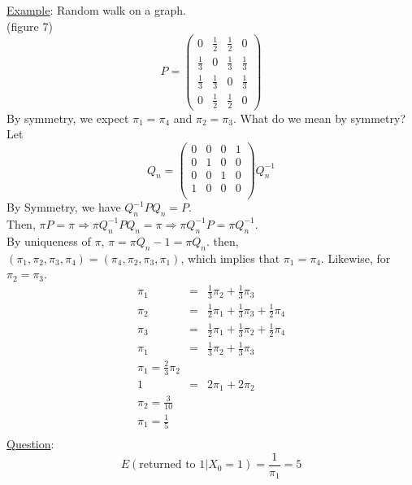   \underline{Example}: Random walk on a graph.\\
    (figure 7)\\
    $$
    P = \left(\begin{array}{cccc}
        0 & \frac{1}{2} & \frac{1}{2} & 0\\
        \frac{1}{3} & 0 & \frac{1}{3} & \frac{1}{3}\\
        \frac{1}{3} & \frac{1}{3} & 0 & \frac{1}{3}\\
        0 & \frac{1}{2} & \frac{1}{2} & 0
      \end{array}\right)
    $$
    By symmetry, we expect $\pi_1 = \pi_4$ and $\pi_2 = \pi_3$. What do we 
    mean by symmetry?
    Let 
    $$
     Q_n = \left(\begin{array}{cccc}
      0 & 0 & 0 & 1\\
      0 & 1 & 0 & 0\\
      0 & 0 & 1 & 0\\
      1 & 0 & 0 & 0\\
      \end{array}\right)
     Q_n^{-1}
    $$
    By Symmetry, we have $Q_n^{-1}PQ_n = P$.\\
    Then, $\pi P = \pi \Rightarrow \pi Q_n^{-1}PQ_n = \pi
    \Rightarrow \pi Q_n^{-1} P = \pi Q_n^{-1}$.\\
    By uniqueness of $\pi$, $\pi = \pi Q_{n}-1 = \pi Q_{n}$.
    then, $(\pi_1, \pi_2, \pi_3, \pi_4) = (\pi_4, \pi_2, \pi_3, \pi_1)$, which
    implies that $\pi_1 = \pi_4$. Likewise, for $\pi_2 = \pi_3$.\\
    \begin{eqnarray*}
      \pi_1 & = & \frac{1}{3}\pi_2 + \frac{1}{3}\pi_3\\
      \pi_2 & = & \frac{1}{2}\pi_1 + \frac{1}{3}\pi_3 + \frac{1}{2}\pi_4\\
      \pi_3 & = & \frac{1}{2}\pi_1 + \frac{1}{3}\pi_2 + \frac{1}{2}\pi_4\\
      \pi_1 & = & \frac{1}{3}\pi_2 + \frac{1}{3}\pi_3\\
      \pi_1 = \frac{2}{3}\pi_2\\
      1 & = & 2\pi_1 + 2\pi_2\\
      \pi_2 = \frac{3}{10}\\
      \pi_1 = \frac{1}{5}\\
    \end{eqnarray*}
    \underline{Question}:
    $$
      E(\text{returned to 1} | X_0 = 1) = \frac{1}{\pi_1} = 5
    $$
